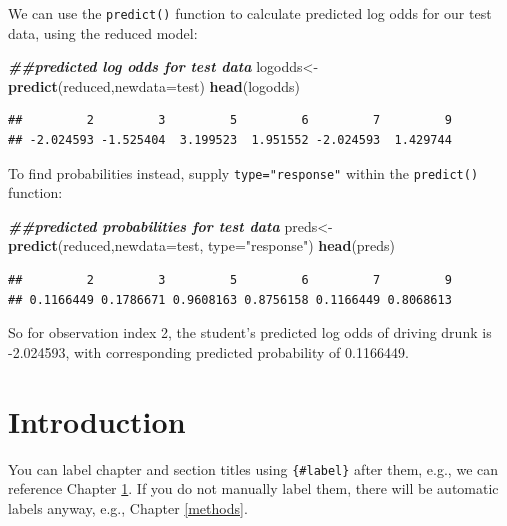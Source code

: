 \documentclass[
]{book}
\newenvironment{Shaded}{\begin{snugshade}}{\end{snugshade}}
\newcommand{\AttributeTok}[1]{\textcolor[rgb]{0.13,0.29,0.53}{#1}}
\newcommand{\DocumentationTok}[1]{\textcolor[rgb]{0.56,0.35,0.01}{\textbf{\textit{#1}}}}
\newcommand{\FunctionTok}[1]{\textcolor[rgb]{0.13,0.29,0.53}{\textbf{#1}}}
\newcommand{\NormalTok}[1]{#1}
\newcommand{\OtherTok}[1]{\textcolor[rgb]{0.56,0.35,0.01}{#1}}
\newcommand{\StringTok}[1]{\textcolor[rgb]{0.31,0.60,0.02}{#1}}
\begin{document}
We can use the \texttt{predict()} function to calculate predicted log odds for our test data, using the reduced model:

\begin{Shaded}
\begin{Highlighting}[]
\DocumentationTok{\#\#predicted log odds for test data}
\NormalTok{logodds}\OtherTok{\textless{}{-}}\FunctionTok{predict}\NormalTok{(reduced,}\AttributeTok{newdata=}\NormalTok{test)}
\FunctionTok{head}\NormalTok{(logodds)}
\end{Highlighting}
\end{Shaded}

\begin{verbatim}
##         2         3         5         6         7         9 
## -2.024593 -1.525404  3.199523  1.951552 -2.024593  1.429744
\end{verbatim}

To find probabilities instead, supply \texttt{type="response"} within the \texttt{predict()} function:

\begin{Shaded}
\begin{Highlighting}[]
\DocumentationTok{\#\#predicted probabilities for test data}
\NormalTok{preds}\OtherTok{\textless{}{-}}\FunctionTok{predict}\NormalTok{(reduced,}\AttributeTok{newdata=}\NormalTok{test, }\AttributeTok{type=}\StringTok{"response"}\NormalTok{)}
\FunctionTok{head}\NormalTok{(preds)}
\end{Highlighting}
\end{Shaded}

\begin{verbatim}
##         2         3         5         6         7         9 
## 0.1166449 0.1786671 0.9608163 0.8756158 0.1166449 0.8068613
\end{verbatim}

So for observation index 2, the student's predicted log odds of driving drunk is -2.024593, with corresponding predicted probability of 0.1166449.

\hypertarget{intro}{%
\chapter{Introduction}\label{intro}}

You can label chapter and section titles using \texttt{\{\#label\}} after them, e.g., we can reference Chapter \ref{intro}. If you do not manually label them, there will be automatic labels anyway, e.g., Chapter \ref{methods}.
\end{document}
